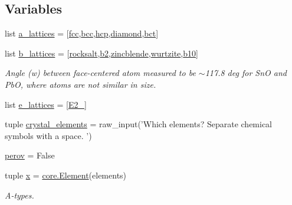 \subsection*{Variables}
\begin{DoxyCompactItemize}
\item 
list \hyperlink{namespacesmact_1_1parameters_afc9fe46cf8520399c024a279a27b8031}{a\+\_\+lattices} = \mbox{[}\hyperlink{namespacesmact_1_1parameters_a16867ca20c91dd8b7f4d519b220b08e3}{fcc},\hyperlink{namespacesmact_1_1parameters_a1bae56380a1d36c8c0a2fe0323fb1ba5}{bcc},\hyperlink{namespacesmact_1_1parameters_a1e720a4abb24a6ab1e663e1ac70b1db1}{hcp},\hyperlink{namespacesmact_1_1parameters_a7acfd40bb068480e79670cfe1960f21d}{diamond},\hyperlink{namespacesmact_1_1parameters_a16ccefd0b7e9ced870e9bb28cd9caa18}{bct}\mbox{]}
\item 
list \hyperlink{namespacesmact_1_1parameters_a998d11eabc47866af083d819a2dca9cf}{b\+\_\+lattices} = \mbox{[}\hyperlink{namespacesmact_1_1parameters_afde267246e2f4aded9e49557939c2a0b}{rocksalt},\hyperlink{namespacesmact_1_1parameters_a6517436ba44653f21ddbb58b73b8fb84}{b2},\hyperlink{namespacesmact_1_1parameters_a3b2f879f7fa985be9f19a9991addb20e}{zincblende},\hyperlink{namespacesmact_1_1parameters_ab26b2a7bf4ad5538de465332c1a7c09b}{wurtzite},\hyperlink{namespacesmact_1_1parameters_afca249beab0792afc200ee2fc1714fbe}{b10}\mbox{]}
\begin{DoxyCompactList}\small\item\em Angle (w) between face-\/centered atom measured to be $\sim$117.8 deg for Sn\+O and Pb\+O, where atoms are not similar in size. \end{DoxyCompactList}\item 
list \hyperlink{namespacesmact_1_1parameters_abdc23b776276418ce7044c62e52c2a32}{e\+\_\+lattices} = \mbox{[}\hyperlink{namespacesmact_1_1parameters_a65318bbc38b59562936b20c221a64a22}{E2\+\_}\mbox{]}
\item 
tuple \hyperlink{namespacesmact_1_1parameters_a88c84d99ceb967bfb250f0b64c8a7818}{crystal\+\_\+elements} = raw\+\_\+input('Which elements? Separate chemical symbols with a space. ')
\item 
\hyperlink{namespacesmact_1_1parameters_a17a85db758a777f49064168e1c8c9d6b}{perov} = False
\item 
tuple \hyperlink{namespacesmact_1_1parameters_a7ffa704a6ef8436803e18fcef5d9f65c}{x} = \hyperlink{classsmact_1_1core_1_1_element}{core.\+Element}(elements)
\begin{DoxyCompactList}\small\item\em A-\/types. \end{DoxyCompactList}\item 

\end{DoxyCompactItemize}
